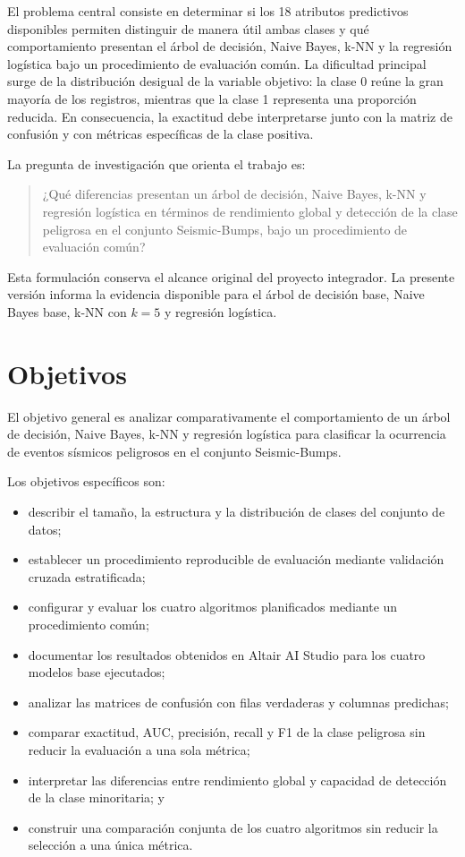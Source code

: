 \documentclass[12pt,a4paper]{article}
\begin{document}
El problema central consiste en determinar si los 18 atributos predictivos disponibles permiten distinguir de manera útil ambas clases y qué comportamiento presentan el árbol de decisión, Naive Bayes, k-NN y la regresión logística bajo un procedimiento de evaluación común. La dificultad principal surge de la distribución desigual de la variable objetivo: la clase 0 reúne la gran mayoría de los registros, mientras que la clase 1 representa una proporción reducida. En consecuencia, la exactitud debe interpretarse junto con la matriz de confusión y con métricas específicas de la clase positiva.

La pregunta de investigación que orienta el trabajo es:
\begin{quote}
¿Qué diferencias presentan un árbol de decisión, Naive Bayes, k-NN y regresión logística en términos de rendimiento global y detección de la clase peligrosa en el conjunto Seismic-Bumps, bajo un procedimiento de evaluación común?
\end{quote}
Esta formulación conserva el alcance original del proyecto integrador. La presente versión informa la evidencia disponible para el árbol de decisión base, Naive Bayes base, k-NN con $k=5$ y regresión logística.

\section{Objetivos}
El objetivo general es analizar comparativamente el comportamiento de un árbol de decisión, Naive Bayes, k-NN y regresión logística para clasificar la ocurrencia de eventos sísmicos peligrosos en el conjunto Seismic-Bumps.

Los objetivos específicos son:
\begin{itemize}
\item describir el tamaño, la estructura y la distribución de clases del conjunto de datos;
\item establecer un procedimiento reproducible de evaluación mediante validación cruzada estratificada;
\item configurar y evaluar los cuatro algoritmos planificados mediante un procedimiento común;
\item documentar los resultados obtenidos en Altair AI Studio para los cuatro modelos base ejecutados;
\item analizar las matrices de confusión con filas verdaderas y columnas predichas;
\item comparar exactitud, AUC, precisión, recall y F1 de la clase peligrosa sin reducir la evaluación a una sola métrica;
\item interpretar las diferencias entre rendimiento global y capacidad de detección de la clase minoritaria; y
\item construir una comparación conjunta de los cuatro algoritmos sin reducir la selección a una única métrica.
\end{itemize}
\end{document}
